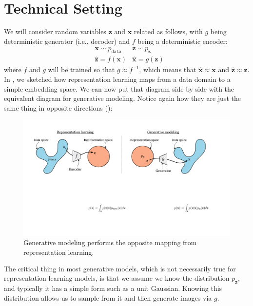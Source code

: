 \section{Technical Setting}
We will consider random variables $\mathbf{z}$ and $\mathbf{x}$ related as follows, with $g$ being deterministic generator (i.e., decoder) and $f$ being a deterministic encoder:
\begin{align}
    &\mathbf{x} \sim p_{\texttt{data}} &\mathbf{z} \sim p_{\mathbf{z}} \\
    &\hat{\mathbf{z}} = f(\mathbf{x}) &\hat{\mathbf{x}} = g(\mathbf{z})
\end{align}
where $f$ and $g$ will be trained so that $g \approx f^{-1}$, which means that $\hat{\mathbf{x}} \approx \mathbf{x}$ and $\hat{\mathbf{z}} \approx \mathbf{z}$. In \fig{\ref{fig:representation_learning:rep_learning_schematic}}, we sketched how representation learning maps from a data domain to a simple embedding space. We can now put that diagram side by side with the equivalent diagram for generative modeling. Notice again how they are just the same thing in opposite directions (\fig{\ref{fig:generative_modeling_and_representation_learning:genrep_schematic}}):
\begin{figure}[h!]
    \centerline{
    \includegraphics[width=1.0\linewidth]{./figures/generative_modeling_and_representation_learning/genrep_schematic.pdf}
    }
    \caption{Generative modeling performs the opposite mapping from representation learning.}
    \label{fig:generative_modeling_and_representation_learning:genrep_schematic}
\end{figure}

The critical thing in most generative models, which is not necessarily true for representation learning models, is that we assume we know the distribution $p_{\mathbf{z}}$, and typically it has a simple form such as a unit Gaussian. Knowing this distribution allows us to sample from it and then generate images via $g$.

